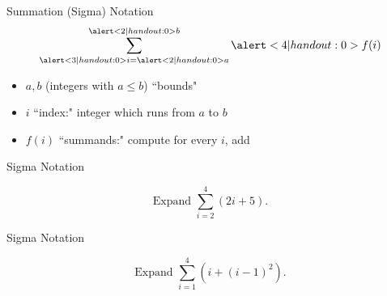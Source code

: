 
\begin{frame}{Summation (Sigma) Notation}
\[\sum_{\alert<3|handout:0>{i}=\alert<2|handout:0>{a}}^{\alert<2|handout:0>{b}} \alert<4|handout:0>{f(i)}\]\pause
\begin{itemize}[<+-| alert@+>] 
\item $a,b$ (integers with $a\le b$) ``bounds"
\item $i$ ``index:" integer which runs from $a$ to $b$
\item $f(i)$ ``summands:" compute for every $i$, add
\end{itemize}
\onslide<+->{ \[\sum\limits_{i=a}^b f(i) = f(a) + f(a+1) + f(a+2)+\cdots + f(b)\]}
\end{frame}
\begin{frame}[t]{Sigma Notation}

\[\text{Expand }\sum_{i=2}^4 (2i+5).\]

\end{frame}
\begin{frame}[t]{Sigma Notation}

\[\text{Expand } \sum_{i=1}^4 (i+(i-1)^2).\]

\end{frame}

